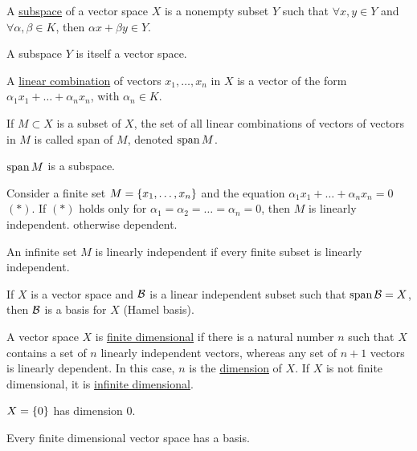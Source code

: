 \documentclass[]{article}
\begin{document}
\begin{definition}
	A \ul{subspace} of a vector space $X$ is a nonempty subset $Y$ such that $\forall x,y\in Y$ and $\forall \alpha,\beta\in K$, then $\alpha x+\beta y\in Y$.
\end{definition}
\begin{note}
	A subspace $Y$ is itself a vector space.
\end{note}
\begin{definition}
	A \ul{linear combination} of vectors $x_1,\dots,x_n$ in $X$ is a vector of the form $\alpha_1x_1+\dots+\alpha_nx_n$, with $\alpha_n\in K$.
\end{definition}
\begin{definition}
	If $M\subset X$ is a subset of $X$, the set of all linear combinations of vectors of vectors in $M$ is called span of $M$, denoted $\text{span}\,M$.
\end{definition}
\begin{note}
	$\text{span}\,M$ is a subspace.
\end{note}
\begin{definition}
	Consider a finite set $M = \left\{ x_1,\dots,x_n \right\}$ and the equation $\alpha_1x_1 + \dots + \alpha_nx_n = 0$ $(*)$.
	If $(*)$ holds only for $\alpha_1=\alpha_2=\dots=\alpha_n = 0$, then $M$ is linearly independent. otherwise dependent.
\end{definition}

An infinite set $M$ is linearly independent if every finite subset is linearly independent.

\begin{definition}
	If $X$ is a vector space and $\mathcal{B}$ is a linear independent subset such that $\text{span}\,\mathcal{B} = X$, then $\mathcal{B}$ is a basis for $X$ (Hamel basis).
\end{definition}

\begin{definition}
	A vector space $X$ is \ul{finite dimensional} if there is a natural number $n$ such that $X$ contains a set of $n$ linearly independent vectors, whereas any set of $n+1$ vectors is linearly dependent.
	In this case, $n$ is the \ul{dimension} of $X$.
	If $X$ is not finite dimensional, it is \ul{infinite dimensional}.
\end{definition}
\begin{note}
	$X = \left\{ 0 \right\}$ has dimension 0.
\end{note}
\begin{corollary}
	Every finite dimensional vector space has a basis.
\end{corollary}
\end{document}
